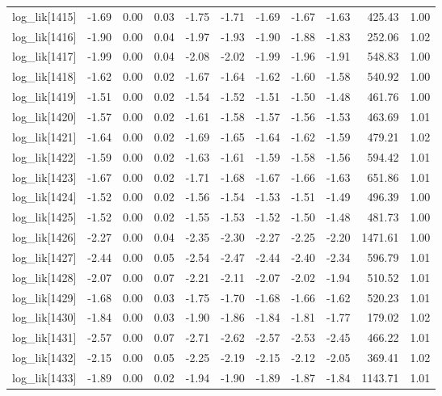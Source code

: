\begin{table}[ht]
\begin{tabular}{rrrrrrrrrrr}
  log\_lik[1415] & -1.69 & 0.00 & 0.03 & -1.75 & -1.71 & -1.69 & -1.67 & -1.63 & 425.43 & 1.00 \\ 
  log\_lik[1416] & -1.90 & 0.00 & 0.04 & -1.97 & -1.93 & -1.90 & -1.88 & -1.83 & 252.06 & 1.02 \\ 
  log\_lik[1417] & -1.99 & 0.00 & 0.04 & -2.08 & -2.02 & -1.99 & -1.96 & -1.91 & 548.83 & 1.00 \\ 
  log\_lik[1418] & -1.62 & 0.00 & 0.02 & -1.67 & -1.64 & -1.62 & -1.60 & -1.58 & 540.92 & 1.00 \\ 
  log\_lik[1419] & -1.51 & 0.00 & 0.02 & -1.54 & -1.52 & -1.51 & -1.50 & -1.48 & 461.76 & 1.00 \\ 
  log\_lik[1420] & -1.57 & 0.00 & 0.02 & -1.61 & -1.58 & -1.57 & -1.56 & -1.53 & 463.69 & 1.01 \\ 
  log\_lik[1421] & -1.64 & 0.00 & 0.02 & -1.69 & -1.65 & -1.64 & -1.62 & -1.59 & 479.21 & 1.02 \\ 
  log\_lik[1422] & -1.59 & 0.00 & 0.02 & -1.63 & -1.61 & -1.59 & -1.58 & -1.56 & 594.42 & 1.01 \\ 
  log\_lik[1423] & -1.67 & 0.00 & 0.02 & -1.71 & -1.68 & -1.67 & -1.66 & -1.63 & 651.86 & 1.01 \\ 
  log\_lik[1424] & -1.52 & 0.00 & 0.02 & -1.56 & -1.54 & -1.53 & -1.51 & -1.49 & 496.39 & 1.00 \\ 
  log\_lik[1425] & -1.52 & 0.00 & 0.02 & -1.55 & -1.53 & -1.52 & -1.50 & -1.48 & 481.73 & 1.00 \\ 
  log\_lik[1426] & -2.27 & 0.00 & 0.04 & -2.35 & -2.30 & -2.27 & -2.25 & -2.20 & 1471.61 & 1.00 \\ 
  log\_lik[1427] & -2.44 & 0.00 & 0.05 & -2.54 & -2.47 & -2.44 & -2.40 & -2.34 & 596.79 & 1.01 \\ 
  log\_lik[1428] & -2.07 & 0.00 & 0.07 & -2.21 & -2.11 & -2.07 & -2.02 & -1.94 & 510.52 & 1.01 \\ 
  log\_lik[1429] & -1.68 & 0.00 & 0.03 & -1.75 & -1.70 & -1.68 & -1.66 & -1.62 & 520.23 & 1.01 \\ 
  log\_lik[1430] & -1.84 & 0.00 & 0.03 & -1.90 & -1.86 & -1.84 & -1.81 & -1.77 & 179.02 & 1.02 \\ 
  log\_lik[1431] & -2.57 & 0.00 & 0.07 & -2.71 & -2.62 & -2.57 & -2.53 & -2.45 & 466.22 & 1.01 \\ 
  log\_lik[1432] & -2.15 & 0.00 & 0.05 & -2.25 & -2.19 & -2.15 & -2.12 & -2.05 & 369.41 & 1.02 \\ 
  log\_lik[1433] & -1.89 & 0.00 & 0.02 & -1.94 & -1.90 & -1.89 & -1.87 & -1.84 & 1143.71 & 1.01 \\ 

\end{tabular}
\end{table}

